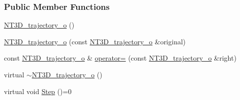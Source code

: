 \subsubsection*{Public Member Functions}
\begin{DoxyCompactItemize}
\item 
\hyperlink{class_n_t3_d__trajectory__o_ac69c4a9d4957ca73c88029afc466c8fe}{NT3D\_\-trajectory\_\-o} ()
\item 
\hyperlink{class_n_t3_d__trajectory__o_aa8d60c82eb99dd70bfbc8e393d148edb}{NT3D\_\-trajectory\_\-o} (const \hyperlink{class_n_t3_d__trajectory__o}{NT3D\_\-trajectory\_\-o} \&original)
\item 
const \hyperlink{class_n_t3_d__trajectory__o}{NT3D\_\-trajectory\_\-o} \& \hyperlink{class_n_t3_d__trajectory__o_a28d9996757f920a26477f64e826b8ac1}{operator=} (const \hyperlink{class_n_t3_d__trajectory__o}{NT3D\_\-trajectory\_\-o} \&right)
\item 
virtual \hyperlink{class_n_t3_d__trajectory__o_a5dfcce7fcf333c51bca8e05444a001a3}{$\sim$NT3D\_\-trajectory\_\-o} ()
\item 
virtual void \hyperlink{class_n_t3_d__trajectory__o_a282898c71b417423e3802f2ef149fde9}{Step} ()=0
\end{DoxyCompactItemize}
